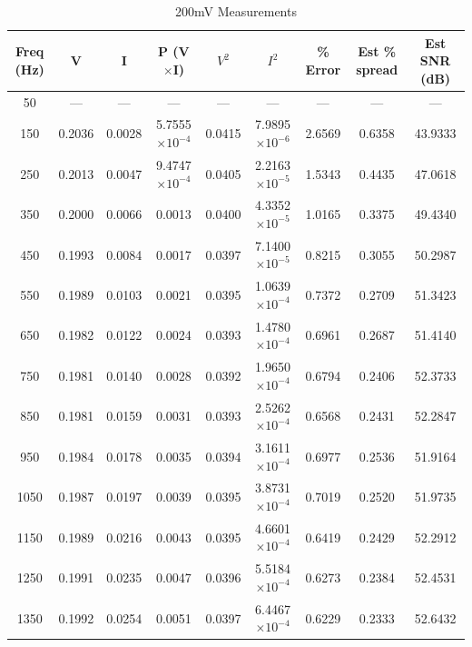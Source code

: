 
\begin{table}[htbp]
  \centering
  \caption{200mV Measurements}
  \label{tab:200mv}
  \small
  \begin{tabular}{|c|c|c|c|c|c|c|c|c|}
    \hline
    \textbf{Freq (Hz)} & \textbf{V} & \textbf{I} & \textbf{P (V$\times$I)} & \textbf{$V^2$} & \textbf{$I^2$} & \textbf{\% Error} & \textbf{Est \% spread} & \textbf{Est SNR (dB)} \\
    \hline
    50 & --- & --- & --- & --- & --- & --- & --- & --- \\
    150 & 0.2036 & 0.0028 & 5.7555$\times 10^{-4}$ & 0.0415 & 7.9895$\times 10^{-6}$ & 2.6569 & 0.6358 & 43.9333 \\
    250 & 0.2013 & 0.0047 & 9.4747$\times 10^{-4}$ & 0.0405 & 2.2163$\times 10^{-5}$ & 1.5343 & 0.4435 & 47.0618 \\
    350 & 0.2000 & 0.0066 & 0.0013 & 0.0400 & 4.3352$\times 10^{-5}$ & 1.0165 & 0.3375 & 49.4340 \\
    450 & 0.1993 & 0.0084 & 0.0017 & 0.0397 & 7.1400$\times 10^{-5}$ & 0.8215 & 0.3055 & 50.2987 \\
    \hline
    550 & 0.1989 & 0.0103 & 0.0021 & 0.0395 & 1.0639$\times 10^{-4}$ & 0.7372 & 0.2709 & 51.3423 \\
    650 & 0.1982 & 0.0122 & 0.0024 & 0.0393 & 1.4780$\times 10^{-4}$ & 0.6961 & 0.2687 & 51.4140 \\
    750 & 0.1981 & 0.0140 & 0.0028 & 0.0392 & 1.9650$\times 10^{-4}$ & 0.6794 & 0.2406 & 52.3733 \\
    850 & 0.1981 & 0.0159 & 0.0031 & 0.0393 & 2.5262$\times 10^{-4}$ & 0.6568 & 0.2431 & 52.2847 \\
    950 & 0.1984 & 0.0178 & 0.0035 & 0.0394 & 3.1611$\times 10^{-4}$ & 0.6977 & 0.2536 & 51.9164 \\
    \hline
    1050 & 0.1987 & 0.0197 & 0.0039 & 0.0395 & 3.8731$\times 10^{-4}$ & 0.7019 & 0.2520 & 51.9735 \\
    1150 & 0.1989 & 0.0216 & 0.0043 & 0.0395 & 4.6601$\times 10^{-4}$ & 0.6419 & 0.2429 & 52.2912 \\
    1250 & 0.1991 & 0.0235 & 0.0047 & 0.0396 & 5.5184$\times 10^{-4}$ & 0.6273 & 0.2384 & 52.4531 \\
    1350 & 0.1992 & 0.0254 & 0.0051 & 0.0397 & 6.4467$\times 10^{-4}$ & 0.6229 & 0.2333 & 52.6432 \\

\end{tabular}
\end{table}

